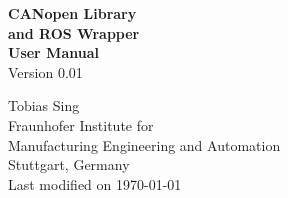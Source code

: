 \begin{titlepage}
\vspace*{13mm}
\begin{center}
  \vspace{10mm} 
         {\Large \bf CANopen Library\\}
  \vspace{2mm}
       {\Large
          \bf
          and ROS Wrapper\\} 
  \vspace{10mm}
       {\large
          \bf
          User Manual\\}
  \vspace{3mm}
       {  Version 0.01\\}
              

  \vspace{60mm}
  \vspace{10mm}
         {\large Tobias Sing} \\
  \vspace{5mm}
         {\large Fraunhofer Institute for}\\
         {\large Manufacturing Engineering and Automation} \\
         \vspace{5mm}
         {\large Stuttgart, Germany} \\
  \vfill
         {\large Last modified on \today}
\end{center}
\end{titlepage}

\clearpage
\thispagestyle{empty}
\cleardoublepage

